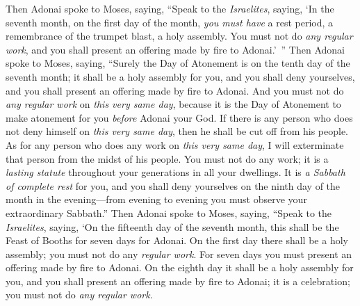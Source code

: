 \begin{biblechapter}
 Then Adonai spoke to Moses, saying,
\verse “Speak to the \textit{Israelites}, saying, ‘In the seventh month, on the first day of the month, \textit{you must have} a rest period, a remembrance of the trumpet blast, a holy assembly.
\verse You must not do \textit{any regular work}, and you shall present an offering made by fire to Adonai.’ ”
 Then Adonai spoke to Moses, saying,
\verse “Surely the Day of Atonement is on the tenth day of the seventh month; it shall be a holy assembly for you, and you shall deny yourselves, and you shall present an offering made by fire to Adonai.
\verse And you must not do \textit{any regular work} on \textit{this very same day}, because it is the Day of Atonement to make atonement for you \textit{before} Adonai your God.
\verse If there is any person who does not deny himself on \textit{this very same day}, then he shall be cut off from his people.
\verse As for any person who does any work on \textit{this very same day}, I will exterminate that person from the midst of his people.
\verse You must not do any work; it is a \textit{lasting statute} throughout your generations in all your dwellings.
\verse It is \textit{a Sabbath of complete rest} for you, and you shall deny yourselves on the ninth day of the month in the evening—from evening to evening you must observe your extraordinary Sabbath.”
 Then Adonai spoke to Moses, saying,
\verse “Speak to the \textit{Israelites}, saying, ‘On the fifteenth day of the seventh month, this shall be the Feast of Booths for seven days for Adonai.
\verse On the first day there shall be a holy assembly; you must not do any \textit{regular work}.
\verse For seven days you must present an offering made by fire to Adonai. On the eighth day it shall be a holy assembly for you, and you shall present an offering made by fire to Adonai; it is a celebration; you must not do \textit{any regular work}.

\end{biblechapter}

